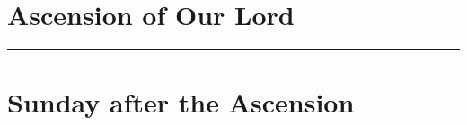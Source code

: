 {{
\section{Ascension of Our Lord}
\label{ascension}
\subtitle{ Class, White or Gold}
\subtitle{I \& II Vespers}

\def\deusinadjutoriumsolemn{T}
\def\postpsalmtitlethree{\needspace{18\baselineskip}}
\def\prepsalmthreeverses{}
\def\preantfive{\needspace{12\baselineskip}}
\def\prevr{\needspace{12\baselineskip}}
\def\premagnificat{\oldneedspace{7\baselineskip}}
\def\premagverses{\greseteolcustos{manual}\oldneedspace{18\baselineskip}}
\def\begincollectcols{%
\begin{parcolumns}[rulebetween,colwidths={1=0.46\linewidth}]{2}}
\def\definevesperspropers{
    \def\prepsalmfive{\greseteolcustos{manual}}
}
\def\definevesperspropersalt{
}
\def\vesperspropersnote{At II Vespers:}
\def\vesperspropersaltnote{At I Vespers:}
\let\printhymnnote=\undefined
\def\hymnlabel{hymn-salutishumanaesator}
\def\prevr{\bigskip{}
\emph{On the Sunday after the Ascension, \emph{\Vbar{}~Dóminus in cælo}, p.~\pageref{vr-sundayafterascension}}.

\bigskip}

\def\commemorations{If today is April 30 or May 1, \emph{First Vespers of St Joseph the Worker} is commemorated as on page \pageref{stjoseph-worker-commem}.}
\printcommemnote[1]{}
\bigskip
\hrule
}

{
\section{Sunday after the Ascension}
\label{easter6}\label{sundayafterascension}
\printcommonvespers{}
\renewcommand{\printhymnnote}{
    \medskip
    \noindent\printnote{Hymn.~\emph{Salútis humánæ Sator}, page \pageref{hymn-salutishumanaesator}.}
    \medskip
    \def\vrlinebreak{T}
    \label{vr-sundayafterascension}
    \printvr[\greseteolcustos{manual}]{\vrtex}{\vtranslation}{\rtranslation}
}
\def\precollect{\printvrdominusincaelo}
\def\premagtitle{\bigskip\bigskip}
\def\postmagtitle{\label{easter6-mag}\label{sundayafterascension-mag}}
\def\premagverses{\oldneedspace{10\baselineskip}}
\benedicamusdomino{}
}
}